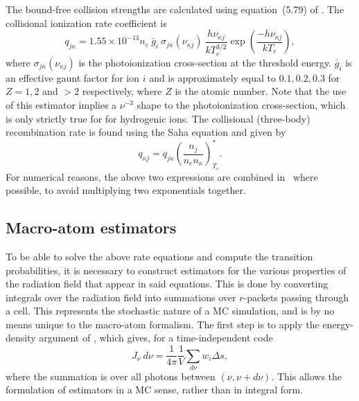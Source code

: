The bound-free collision strengths are calculated using equation~(5.79) of
\cite{mihalas}. The collisional ionization rate coefficient is
\begin{equation}
q_{j\kappa} = 1.55 \times 10^{-13} n_e~\bar{g}_{i}~\sigma_{j\kappa} (\nu_{\kappa j})~
\frac{h \nu_{\kappa j}}{k T_e^{3/2}}
\exp \left( \frac{- h \nu_{\kappa j}}{k T_e} \right),
\label{eq:qioniz}
\end{equation}
where $\sigma_{j\kappa} (\nu_{\kappa j})$ is the photoionization cross-section 
at the threshold energy.
$\bar{g}_{i}$ is an effective gaunt factor for ion $i$ and is approximately
equal to $0.1,0.2,0.3$ for $Z=1,2$ and $>2$ respectively,
where $Z$ is the atomic number. Note that the use of this estimator
implies a $\nu^{-3}$ shape to the photoionization cross-section,
which is only strictly true for for hydrogenic ions.
The collisional (three-body) recombination rate is found using the Saha equation
and given by
\begin{equation}
q_{\kappa j} = q_{j\kappa} \left( \frac{n_j}{n_e n_\kappa} \right)^*_{T_e}.
\label{eq:qrecomb}
\end{equation}
For numerical reasons, the above two expressions are combined in \py\ where 
possible, to avoid multiplying two exponentials together.





\subsection{Macro-atom estimators}
\label{sec:estimators}
To be able to solve the above rate equations and compute the transition 
probabilities, it is necessary to construct estimators for the various properties
of the radiation field that appear in said equations. This is done
by converting integrals over the radiation field into summations over 
$r$-packets passing through a cell. This represents the stochastic nature of
a MC simulation, and is by no means unique to the macro-atom formalism.
The first step is to apply the energy-density argument of \cite{lucy1999radeq},
which gives, for a time-independent code
\begin{equation}
J_\nu~d\nu = \frac{1}{4\pi}\frac{1}{V} \sum_{d\nu} w_i \Delta s,
\end{equation}
where the summation is over all photons between $(\nu, \nu+d\nu)$. This allows
the formulation of estimators in a MC sense, rather than in integral form. 

